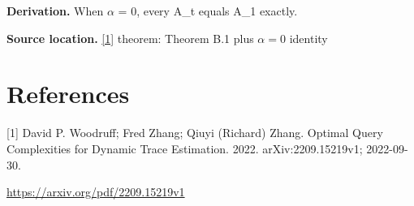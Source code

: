 \documentclass[10pt,a4paper]{article}
\begin{document}
\textbf{Derivation.} When $\alpha$ = 0, every A\_t equals A\_1 exactly.

\textbf{Source location.} \href{https://arxiv.org/pdf/2209.15219v1}{[1]} theorem: Theorem B.1 plus $\alpha =0$ identity

\section{References}
[1] David P. Woodruff; Fred Zhang; Qiuyi (Richard) Zhang. Optimal Query Complexities for Dynamic Trace Estimation. 2022. arXiv:2209.15219v1; 2022-09-30.

\url{https://arxiv.org/pdf/2209.15219v1}
\end{document}

